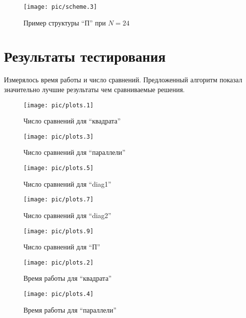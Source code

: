 \begin{figure}
\centering
\texttt{[image: pic/scheme.3]}
\caption{Пример структуры ``П'' при $N = 24$}\label{parper-fig}
\end{figure}

\section{Результаты тестирования}

Измерялось время работы и число сравнений.
Предложенный алгоритм показал значительно лучшие результаты чем сравниваемые решения.

\newpage

\newcommand\scalesize{0.77}
\newcommand\figalign\centering

\begin{figure}
\figalign
\texttt{[image: pic/plots.1]}
\caption{Число сравнений для ``квадрата''}\label{plot-square-comp}
\end{figure}

\begin{figure}
\figalign
\texttt{[image: pic/plots.3]}
\caption{Число сравнений для ``параллели''}\label{plot-parallel-comp}
\end{figure}

\begin{figure}
\figalign
\texttt{[image: pic/plots.5]}
\caption{Число сравнений для ``diag1''}\label{plot-diag1-comp}
\end{figure}

\begin{figure}
\figalign
\texttt{[image: pic/plots.7]}
\caption{Число сравнений для ``diag2''}\label{plot-diag2-comp}
\end{figure}

\begin{figure}[b]
\figalign
\texttt{[image: pic/plots.9]}
\caption{Число сравнений для ``П''}\label{plot-parper-comp}
\end{figure}

\newpage

\begin{figure}
\figalign
\texttt{[image: pic/plots.2]}
\caption{Время работы для ``квадрата''}\label{plot-square-time}
\end{figure}

\begin{figure}
\figalign
\texttt{[image: pic/plots.4]}
\caption{Время работы для ``параллели''}\label{plot-parallel-time}
\end{figure}

